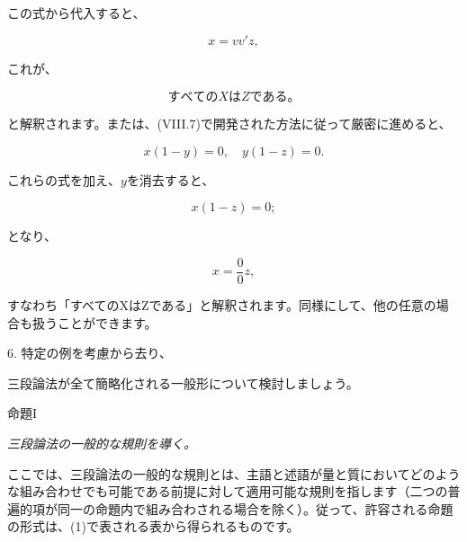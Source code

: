 \documentclass[a4paper,11pt,openany]{ltjsbook}
\begin{document}
この式から代入すると、

\begin{equation*}
x = vv'z,
\end{equation*}

これが、

\begin{equation*}
すべてのXはZである。
\end{equation*}

と解釈されます。または、(VIII.7)で開発された方法に従って厳密に進めると、

\begin{equation*}
x(1-y)=0,\quad y(1-z)=0.
\end{equation*}

これらの式を加え、$y$を消去すると、

\begin{equation*}
x(1-z)=0;
\end{equation*}

となり、

\begin{equation*}
x = \frac{0}{0}z,
\end{equation*}

すなわち「すべてのXはZである」と解釈されます。同様にして、他の任意の場合も扱うことができます。

6. 特定の例を考慮から去り、

三段論法が全て簡略化される一般形について検討しましょう。

\begin{center}
\textsc{命題I}

\emph{三段論法の一般的な規則を導く。}
\end{center}

ここでは、三段論法の一般的な規則とは、主語と述語が量と質においてどのような組み合わせでも可能である前提に対して適用可能な規則を指します（二つの普遍的項が同一の命題内で組み合わされる場合を除く）。従って、許容される命題の形式は、(1)で表される表から得られるものです。
\end{document}
